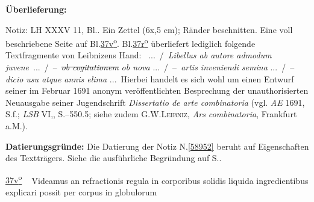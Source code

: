 %
\frenchspacing%
\begin{ledgroupsized}[r]{120mm}%
\footnotesize%
\pstart%
\noindent\textbf{Überlieferung:}
\pend%
\end{ledgroupsized}%
\begin{ledgroupsized}[r]{114mm}%
\footnotesize%
\pstart%
\parindent -6mm%
%
Notiz:
LH XXXV 11, Bl..
Ein Zettel (6\;x,5 cm);
Ränder beschnitten.
Eine voll beschriebene Seite auf Bl.\;\href{\Scan{LH_35_11_14_037v}}{37\:v\textsuperscript{o}}.
Bl.\;\href{\Scan{LH_35_11_14_037r}}{37\:r\textsuperscript{o}} überliefert lediglich folgende Textfragmente von Leibnizens Hand:
\textlangle{}\textrangle\ \textlangle...\textrangle\ \lbrack/\rbrack\ \textlangle \textit{Libell}\textrangle\textit{us ab autore admodum} \textlangle\textit{juvene}\textrangle\ \textlangle...\textrangle\ \lbrack/\rbrack\ \textlangle--\textrangle\ \sout{\textit{ob cogitationem}} \textit{ob nova} \textlangle...\textrangle\ \lbrack/\rbrack\ \textlangle--\textrangle\ \textit{artis inveniendi semina} \textlangle...\textrangle\ \lbrack/\rbrack\ \textlangle--\textrangle\textit{dicio usu atque annis elima} \textlangle...\textrangle\
Hierbei handelt es sich wohl um einen Entwurf seiner im Februar 1691 anonym veröffentlichten Besprechung der unauthorisierten Neuausgabe seiner Jugendschrift \textit{Dissertatio de arte combinatoria}
(vgl. \textit{AE} 1691, S.\;63\:f.; \textit{LSB} VI,\;2, S.\;549.9--550.5;\cite{01023}\cite{01486}
siehe zudem \textsc{G.\:W.\;Leibniz}, \textit{Ars combinatoria}, Frankfurt a.\:M.\;1690).\cite{01485}
\pend%
\end{ledgroupsized}%
\vspace{5mm}%
\begin{ledgroup}%
\footnotesize%
\pstart%
\noindent%
\textbf{Datierungsgründe:}
Die Datierung der Notiz N.\;\ref{58952} beruht auf Eigenschaften des Textträgers.
Siehe die ausführliche Begründung auf S.\;\pageref{58952_dat}.%
\pend%
\end{ledgroup}%
%
\frenchspacing%
\vspace{8mm}%
\normalsize%
\pstart%
\noindent%
\lbrack%
\href{\Scan{LH_35_11_14_037v}}%
{37\:v\textsuperscript{o}}%
\rbrack\ %
Videamus
an refractionis regula%
%
in corporibus solidis%
liquida ingredientibus%
explicari possit per corpus%
in globulorum%
